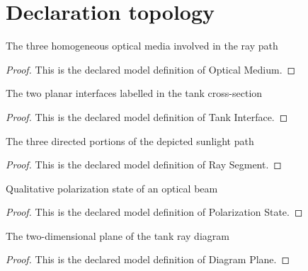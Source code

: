 \section{Declaration topology}
\begin{definition}
  \label{def:physics:phyx-mini-0103:phyxminiproblems-problemphyxmini0103-opticalmedium}
  The three homogeneous optical media involved in the ray path
\end{definition}
\begin{proof}
  This is the declared model definition of Optical Medium.
\end{proof}
\begin{definition}
  \label{def:physics:phyx-mini-0103:phyxminiproblems-problemphyxmini0103-tankinterface}
  The two planar interfaces labelled in the tank cross-section
\end{definition}
\begin{proof}
  This is the declared model definition of Tank Interface.
\end{proof}
\begin{definition}
  \label{def:physics:phyx-mini-0103:phyxminiproblems-problemphyxmini0103-raysegment}
  The three directed portions of the depicted sunlight path
\end{definition}
\begin{proof}
  This is the declared model definition of Ray Segment.
\end{proof}
\begin{definition}
  \label{def:physics:phyx-mini-0103:phyxminiproblems-problemphyxmini0103-polarizationstate}
  Qualitative polarization state of an optical beam
\end{definition}
\begin{proof}
  This is the declared model definition of Polarization State.
\end{proof}
\begin{definition}
  \label{def:physics:phyx-mini-0103:phyxminiproblems-problemphyxmini0103-diagramplane}
  The two-dimensional plane of the tank ray diagram
\end{definition}
\begin{proof}
  This is the declared model definition of Diagram Plane.
\end{proof}
